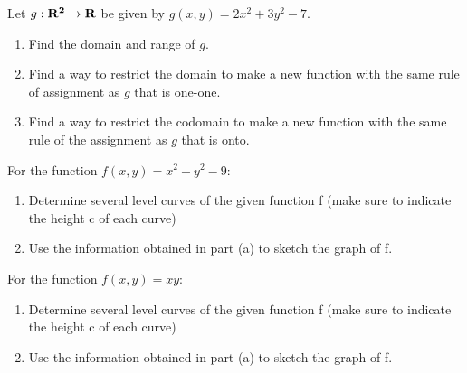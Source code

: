 \documentclass[12pt,letterpaper]{hmcpset}
\begin{document}

\begin{problem}[2.1.2]
    Let $g: \bf{R}^2 \rightarrow \bf{R}$ be given by $g(x, y) = 2x^2 + 3y^2 - 7.$
    \begin{enumerate}
        \item
        		Find the domain and range of $g$.
        \item 
        		Find a way to restrict the domain to make a new function with the same rule of assignment as $g$ that is one-one.
	\item
		Find a way to restrict the codomain to make a new function with the same rule of the assignment as $g$ that is onto.
    \end{enumerate}
\end{problem}

\begin{solution}
    \vfill
\end{solution}
\newpage

\begin{problem}[2.1.16]
    For the function $f(x, y) = x^2 + y^2 - 9$:
    \begin{enumerate}
        \item Determine several level curves of the given function f (make sure to indicate the height c of each curve)
        \item Use the information obtained in part (a) to sketch the graph of f.
    \end{enumerate}
\end{problem}

\begin{solution}
 	\vfill
\end{solution}
\newpage

\begin{problem}[2.1.19]
        For the function $f(x, y) = xy$:
    \begin{enumerate}
        \item Determine several level curves of the given function f (make sure to indicate the height c of each curve)
        \item Use the information obtained in part (a) to sketch the graph of f.
    \end{enumerate}
\end{problem}
\end{document}
